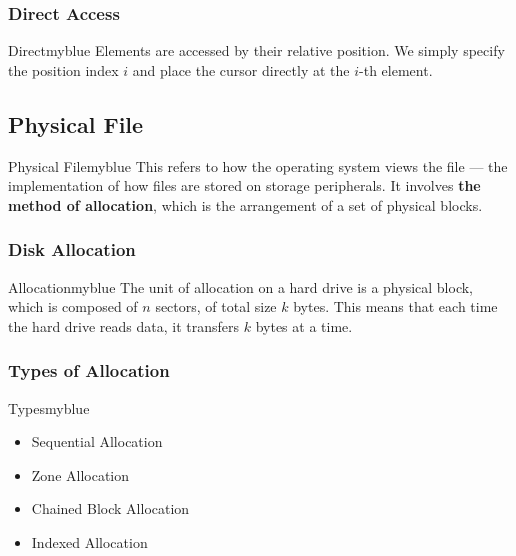 \vspace{0.25cm}
\subsubsection{Direct Access}
\begin{prettyBox}{Direct}{myblue}
Elements are accessed by their relative position. We simply specify the position index \(i\) 
and place the cursor directly at the \(i\)-th element.
\end{prettyBox}

\newpage
\null
\vspace{0.35cm}

\subsection{Physical File}
\begin{prettyBox}{Physical File}{myblue}
This refers to how the operating system views the file — the implementation 
of how files are stored on storage peripherals. It involves \textbf{the method of allocation}, 
which is the arrangement of a set of physical blocks.
\end{prettyBox}

\vspace{0.25cm}

\subsubsection{Disk Allocation}
\begin{prettyBox}{Allocation}{myblue}
The unit of allocation on a hard drive is a physical block, which is composed of \(n\) sectors, 
of total size \(k\) bytes. This means that each time the hard drive reads data, it transfers 
\(k\) bytes at a time.
\end{prettyBox}

\vspace{0.25cm}

\subsubsection{Types of Allocation}
\begin{prettyBox}{Types}{myblue}
\begin{itemize}
    \item Sequential Allocation
    \item Zone Allocation
    \item Chained Block Allocation
    \item Indexed Allocation
\end{itemize}
\end{prettyBox}

